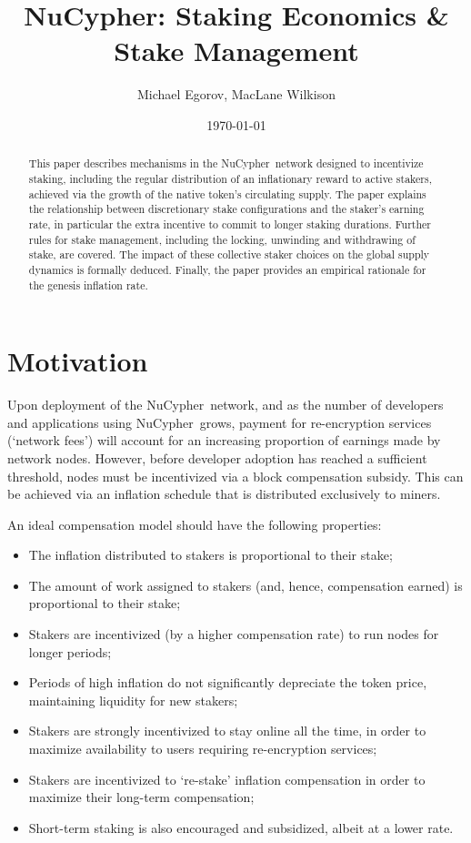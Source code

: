 \documentclass[longbibliography,nofootinbib,twocolumn]{revtex4-1}
\newcommand{\nucypher}{NuCypher}
\begin{document}
\title{\nucypher: Staking Economics \& Stake Management}

\author{Michael Egorov, MacLane Wilkison}

\begin{abstract}
This paper describes mechanisms in the \nucypher~network designed to incentivize staking, including the regular distribution of an inflationary reward to active stakers, achieved via the growth of the native token's circulating supply. The paper explains the relationship between discretionary stake configurations and the staker's earning rate, in particular the extra incentive to commit to longer staking durations. Further rules for stake management, including the locking, unwinding and withdrawing of stake, are covered. The impact of these collective staker choices on the global supply dynamics is formally deduced. Finally, the paper provides an empirical rationale for the genesis inflation rate. 

\end{abstract}

\date{\today}
\maketitle

\section{Motivation}

Upon deployment of the \nucypher~network, and as the number of developers and applications using \nucypher~grows, payment for re-encryption services (`network fees') will account for an increasing proportion of earnings made by network nodes.
However, before developer adoption has reached a sufficient threshold, nodes must be incentivized via a block compensation subsidy.
This can be achieved via an inflation schedule that is distributed exclusively to miners.

An ideal compensation model should have the following properties:
\begin{itemize}
    \item The inflation distributed to stakers is proportional to their stake;
    \item The amount of work assigned to stakers (and, hence, compensation earned) is proportional to their stake;
    \item Stakers are incentivized (by a higher compensation rate) to run nodes for longer periods;
    \item Periods of high inflation do not significantly depreciate the token price, maintaining liquidity for new stakers;
    \item Stakers are strongly incentivized to stay online all the time, in order to maximize availability to users requiring re-encryption services;
    \item Stakers are incentivized to `re-stake' inflation compensation in order to maximize their long-term compensation;
    \item Short-term staking is also encouraged and subsidized, albeit at a lower rate.
\end{itemize}
\end{document}
